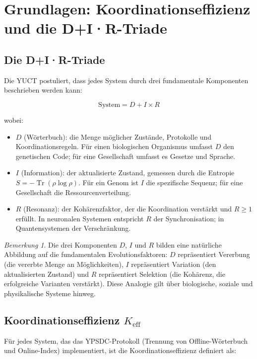 \documentclass[12pt,a4paper]{article}
\theoremstyle{remark}
\newtheorem{remark}[theorem]{Bemerkung}
\newcommand{\Keff}{K_{\mathrm{eff}}}
\DeclareMathOperator{\Tr}{Tr}
\begin{document}
	\section{Grundlagen: Koordinationseffizienz und die D+I·R-Triade}
	\label{sec:foundations}
	
	\subsection{Die D+I·R-Triade}
	
	Die YUCT postuliert, dass jedes System durch drei fundamentale Komponenten beschrieben werden kann:
	
	\begin{equation}
		\text{System} = D + I \times R
		\label{eq:triad}
	\end{equation}
	
	wobei:
	\begin{itemize}
		\item $D$ (Wörterbuch): die Menge möglicher Zustände, Protokolle und Koordinationsregeln. Für einen biologischen Organismus umfasst $D$ den genetischen Code; für eine Gesellschaft umfasst es Gesetze und Sprache.
		\item $I$ (Information): der aktualisierte Zustand, gemessen durch die Entropie $S = -\Tr(\rho \log \rho)$. Für ein Genom ist $I$ die spezifische Sequenz; für eine Gesellschaft die Ressourcenverteilung.
		\item $R$ (Resonanz): der Kohärenzfaktor, der die Koordination verstärkt und $R \geq 1$ erfüllt. In neuronalen Systemen entspricht $R$ der Synchronisation; in Quantensystemen der Verschränkung.
	\end{itemize}
	
	\begin{remark}
		Die drei Komponenten $D$, $I$ und $R$ bilden eine natürliche Abbildung auf die fundamentalen Evolutionsfaktoren: $D$ repräsentiert Vererbung (die vererbte Menge an Möglichkeiten), $I$ repräsentiert Variation (den aktualisierten Zustand) und $R$ repräsentiert Selektion (die Kohärenz, die erfolgreiche Varianten verstärkt). Diese Analogie gilt über biologische, soziale und physikalische Systeme hinweg.
	\end{remark}
	
	\subsection{Koordinationseffizienz $\Keff$}
	
	Für jedes System, das das YPSDC-Protokoll (Trennung von Offline-Wörterbuch und Online-Index) implementiert, ist die Koordinationseffizienz definiert als:
	
\end{document}
